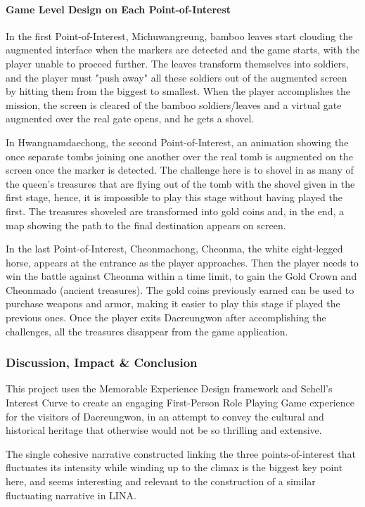 \documentclass[runningheads]{llncs}
\begin{document}
\paragraph{Game Level Design on Each Point-of-Interest} In the first Point-of-Interest, Michuwangreung, bamboo leaves start clouding the augmented interface when the markers are detected and the game starts, with the player unable to proceed further. The leaves transform themselves into soldiers, and the player must "push away" all these soldiers out of the augmented screen by hitting them from the biggest to smallest. When the player accomplishes the mission, the screen is cleared of the bamboo soldiers/leaves and a virtual gate augmented over the real gate opens, and he gets a shovel.
\par In Hwangnamdaechong, the second Point-of-Interest, an animation showing the once separate 
tombs joining one another over the real tomb is augmented on the screen once the marker is detected. The challenge here is to shovel in as many of the queen’s treasures that are flying out of the tomb with the shovel given in the first stage, hence, it is impossible to play this stage 
without having played the first. The treasures shoveled are transformed into gold coins and, in the end, a map showing the path to the final destination appears on screen.
\par In the last Point-of-Interest, Cheonmachong, Cheonma, the white eight-legged horse, appears at the entrance as the player approaches. Then the player needs to win the battle against Cheonma within a time limit, to gain the Gold Crown and Cheonmado (ancient treasures). The gold coins previously earned can be used to purchase weapons and armor, making it easier to play this stage if played the previous ones. Once the player exits Daereungwon after accomplishing the challenges, all the treasures disappear from the game application. 


\subsubsection{Discussion, Impact \& Conclusion}
\par This project uses the Memorable Experience Design framework and Schell's Interest Curve to create an engaging First-Person Role Playing Game experience for the visitors of Daereungwon, in an attempt to convey the cultural and historical heritage that otherwise would not be so thrilling and extensive. 
\par The single cohesive narrative constructed linking the three points-of-interest that fluctuates its intensity while winding up to the climax is the biggest key point here, and seems interesting and relevant to the construction of a similar fluctuating narrative in LINA. 
\end{document}
